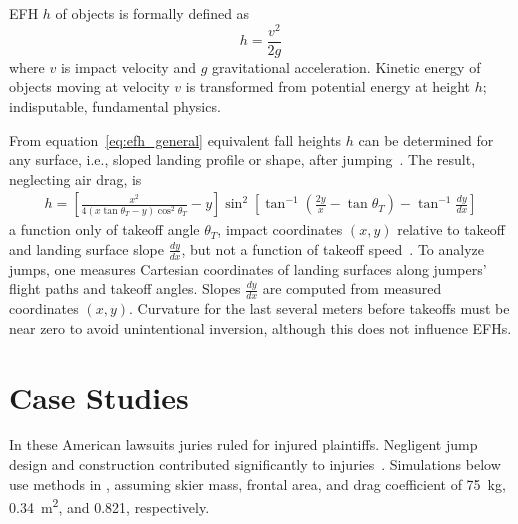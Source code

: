 \documentclass[smallextended]{svjour3}       %
\begin{document}
EFH $h$ of objects is formally defined as
%
\begin{equation}
  h = \frac{v^2}{2g}
  \label{eq:efh_general}
\end{equation}
%
where $v$ is impact velocity and $g$ gravitational acceleration.  Kinetic
energy of objects moving at  velocity $v$  is transformed from potential energy
at height $h$; indisputable, fundamental physics.

From equation~\ref{eq:efh_general} equivalent fall heights $h$ can be
determined for any surface, i.e., sloped landing profile or shape, after
jumping~\cite{Petrone2017}. The result, neglecting air drag, is
%
\begin{align}
  h = \left[\frac{x^2}{4(x\tan\theta_T - y)\cos^{2}\theta_T} - y\right]
    \sin^{2}
    \left[\tan^{-1}\left(\frac{2y}{x} - \tan\theta_T\right) -
    \tan^{-1}\frac{dy}{dx}\right]
  \label{eq:efh}
\end{align}
%
a function only of takeoff angle $\theta_T$, impact coordinates $(x,y)$
relative to takeoff and landing surface slope $\frac{dy}{dx}$, but not a
function of takeoff speed~\cite{Petrone2017}. To analyze jumps, one measures
Cartesian coordinates of landing surfaces along jumpers' flight paths and
takeoff angles. Slopes $\frac{dy}{dx}$ are computed from measured coordinates
$(x,y)$. Curvature for the last several meters before takeoffs must be near
zero to avoid unintentional inversion, although this does not influence EFHs.

\section{Case Studies}
\label{sec:case}
%
In these American lawsuits juries ruled for injured plaintiffs. Negligent jump
design and construction contributed significantly to
injuries~\cite{SuperiorCourtSanFranciscoCounty2002,KingCountySuperiorCourt2008}.
Simulations below use methods in \cite{Levy2015}, assuming skier mass, frontal
area, and drag coefficient of 75~\si{\kg}, 0.34~\si{\meter\squared}, and 0.821,
respectively.
\end{document}
